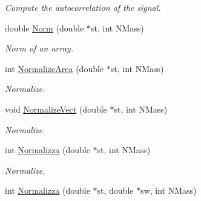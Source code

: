 \begin{DoxyCompactItemize}
\begin{DoxyCompactList}\small\item\em \-Compute the autocorrelation of the signal. \end{DoxyCompactList}\item 
\hypertarget{classMatematica_a842d80157ade9075dce41b8b9f4bb4f3}{double \hyperlink{classMatematica_a842d80157ade9075dce41b8b9f4bb4f3}{\-Norm} (double $\ast$st, int \-N\-Mass)}\label{classMatematica_a842d80157ade9075dce41b8b9f4bb4f3}

\begin{DoxyCompactList}\small\item\em \-Norm of an array. \end{DoxyCompactList}\item 
\hypertarget{classMatematica_ac3425ea4b3f1bc9999c7b6442b106ebe}{int \hyperlink{classMatematica_ac3425ea4b3f1bc9999c7b6442b106ebe}{\-Normalize\-Area} (double $\ast$st, int \-N\-Mass)}\label{classMatematica_ac3425ea4b3f1bc9999c7b6442b106ebe}

\begin{DoxyCompactList}\small\item\em \-Normalize. \end{DoxyCompactList}\item 
\hypertarget{classMatematica_a30066e752b4f5504770d8d8c5687972a}{void \hyperlink{classMatematica_a30066e752b4f5504770d8d8c5687972a}{\-Normalize\-Vect} (double $\ast$st, int \-N\-Mass)}\label{classMatematica_a30066e752b4f5504770d8d8c5687972a}

\begin{DoxyCompactList}\small\item\em \-Normalize. \end{DoxyCompactList}\item 
\hypertarget{classMatematica_aa51fbe747c2dcd8d72980b9624be93a1}{int \hyperlink{classMatematica_aa51fbe747c2dcd8d72980b9624be93a1}{\-Normalizza} (double $\ast$st, int \-N\-Mass)}\label{classMatematica_aa51fbe747c2dcd8d72980b9624be93a1}

\begin{DoxyCompactList}\small\item\em \-Normalize. \end{DoxyCompactList}\item 
\hypertarget{classMatematica_a3221d7079785ecb693e84532d784c302}{int \hyperlink{classMatematica_a3221d7079785ecb693e84532d784c302}{\-Normalizza} (double $\ast$st, double $\ast$sw, int \-N\-Mass)}\label{classMatematica_a3221d7079785ecb693e84532d784c302}


\end{DoxyCompactItemize}
